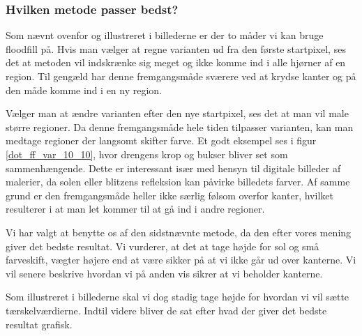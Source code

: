 {\subsubsection{Hvilken metode passer bedst?}
Som nævnt ovenfor og illustreret i billederne er der to måder vi kan
bruge floodfill på. Hvis man vælger at regne varianten ud fra den første
startpixel, ses det at metoden vil indskrænke sig meget og ikke komme
ind i alle hjørner af en region. Til gengæld har denne fremgangsmåde
sværere ved at krydse kanter og på den måde komme ind i en ny region.

Vælger man at ændre varianten efter den nye startpixel, ses det at man
vil male større regioner. Da denne fremgangsmåde hele tiden tilpasser
varianten, kan man medtage regioner der langsomt skifter farve. Et godt
eksempel ses i figur \ref{dot_ff_var_10_10}, hvor drengens krop og
bukser bliver set som sammenhængende. Dette er interessant især med
hensyn til digitale billeder af malerier, da solen eller blitzens
refleksion kan påvirke billedets farver. Af samme grund er den
fremgangsmåde heller ikke særlig følsom overfor kanter, hvilket
resulterer i at man let kommer til at gå ind i andre regioner.

Vi har valgt at benytte os af den sidstnævnte metode, da den efter vores
mening giver det bedste resultat. Vi vurderer, at det at tage højde for sol og
små farveskift, vægter højere end at være sikker på at vi ikke går ud
over kanterne. Vi vil senere beskrive hvordan vi på anden vis sikrer at
vi beholder kanterne.

Som illustreret i billederne skal vi dog stadig tage højde for hvordan
vi vil sætte tærskelværdierne. Indtil videre bliver de sat efter hvad
der giver det bedste resultat grafisk.


}

